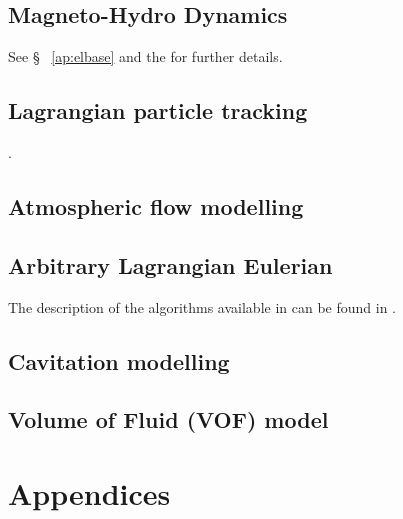 \documentclass[a4paper,10pt,twoside]{csdoc}
\newcounter{prog}[part]
\begin{document}
\chapter{Magneto-Hydro Dynamics}
See \S~ \ref{ap:elbase} and the
 for further
details.

\chapter{Lagrangian particle tracking}
.

\chapter{Atmospheric flow modelling}



\chapter{Arbitrary Lagrangian Eulerian}
The description of the algorithms available in \CS{} can be found in
\cite{ferrand2021finite}.

\chapter{Cavitation modelling}


\chapter{Volume of Fluid (VOF) model}


%
\appendix

\part{Appendices}
\setcounter{section}{0}
\setcounter{equation}{0}
\setcounter{figure}{0}

\end{document}
